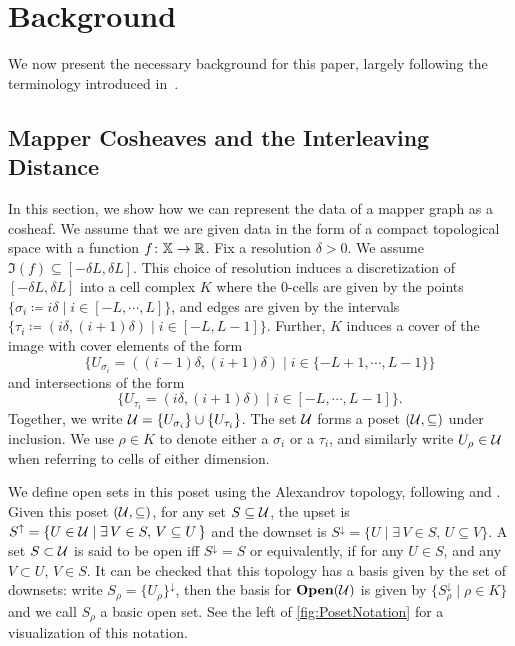 \section{Background}
\label{sec:background}

We now present the necessary background for this paper, largely following the terminology introduced in~\cite{chambers2023bounding}.

 

\subsection{Mapper Cosheaves and the Interleaving Distance}
\label{ssec:functorGraphs}

In this section, we show how we can represent the data of a mapper graph as a cosheaf. 
We assume that we are given data in the form of a compact topological space with a function $f\colon{\mathbb X} \to \mathbb{R}$. 
Fix a resolution $\delta>0$. 
We assume $\Im(f) \subseteq[-\delta L, \delta L]$.
This choice of resolution induces a discretization of $[-\delta L, \delta L]$ into a cell complex $K$ where the 0-cells are given by the points $\{ \sigma_i \coloneqq i \delta \mid i \in [-L, \cdots,L]\}$, and edges are given by the intervals $\{ \tau_i \coloneqq (i \delta, (i+1)\delta) \mid i  \in [-L, L-1] \}$. Further, $K$ induces a cover of the image with cover elements of the form 
%
    \[\{ U_{\sigma_i} = ((i-1)\delta, (i+1)\delta) \mid i \in \{-L+1,\cdots, L-1\}\} \]
%
and intersections of the form
%
    \[\{ U_{\tau_i} = (i\delta, (i+1)\delta) \mid i \in [-L,\cdots, L-1]\}.\]
%
Together, we write $\mathcal{U}= \{U_{\sigma_i}\} \cup \{ U_{\tau_i}\}$. 
The set $\mathcal{U}$ forms a poset $(\mathcal{U}, \subseteq)$ under inclusion. 
We use $\rho \in K$ to denote either a $\sigma_i$ or a $\tau_i$, and similarly write $U_\rho \in \mathcal{U}$ when referring to cells of either dimension.

We define open sets in this poset using the Alexandrov topology, following \cite{Barmak2011} and \cite{chambers2023bounding}.
Given this poset $(\mathcal{U},\subseteq)$, for any set $S \subseteq \mathcal{U}$, the upset is 
$S^{\uparrow} = \{U \in \mathcal{U} \mid \exists \,V \in S,\, V \subseteq U  \,  \}$ 
and the downset is
$S^{\downarrow} = \{ U \mid \exists\,  V \in S,\, U \subseteq V \}$. 
A set $S \subset \mathcal{U}$ is said to be open iff $S^{\downarrow} = S$ or equivalently, if for any $U \in S$, and any $V \subset U$, $V \in S$. 
It can be checked that this topology has a basis given by the set of downsets: 
write $S_\rho = \{ U_{\rho}\}^{\downarrow}$, then the basis for $\mathbf{Open}(\mathcal{U})$ is given by $\{ S_\rho^{\downarrow} \mid \rho \in K\}$ and we call $S_\rho$ a basic open set. 
See the left of \cref{fig:PosetNotation} for a visualization of this notation. 

